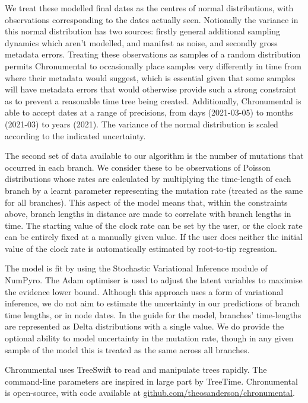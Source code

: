 We treat these modelled final dates as the centres of normal distributions, with observations corresponding to the dates actually seen. Notionally the variance in this normal distribution has two sources: firstly general additional sampling dynamics which aren't modelled, and manifest as noise, and secondly gross metadata errors. Treating these observations as samples of a random distribution permits Chronumental to occasionally place samples very differently in time from where their metadata would suggest, which is essential given that some samples will have metadata errors that would otherwise provide such a strong constraint as to prevent a reasonable time tree being created. Additionally, Chronumental is able to accept dates at a range of precisions, from days (2021-03-05) to months (2021-03) to years (2021). The variance of the normal distribution is scaled according to the indicated uncertainty.

The second set of data available to our algorithm is the number of mutations that occurred in each branch. We consider these to be observations of Poisson distributions whose rates are calculated by multiplying the time-length of each branch by a learnt parameter representing the mutation rate (treated as the same for all branches). This aspect of the model means that, within the constraints above, branch lengths in distance are made to correlate with branch lengths in time. The starting value of the clock rate can be set by the user, or the clock rate can be entirely fixed at a manually given value. If the user does neither the initial value of the clock rate is automatically estimated by root-to-tip regression.

The model is fit by using the Stochastic Variational Inference module of NumPyro. The Adam optimiser is used to adjust the latent variables to maximise the evidence lower bound. Although this approach uses a form of variational inference, we do not aim to estimate the uncertainty in our predictions of branch time lengths, or in node dates. In the guide for the model, branches' time-lengths are represented as Delta distributions with a single value. We do provide the optional ability to model uncertainty in the mutation rate, though in any given sample of the model this is treated as the same across all branches.

Chronumental uses TreeSwift \citep{treeswift} to read and manipulate trees rapidly. The command-line parameters are inspired in large part by TreeTime. Chronumental is open-source, with code available at \url{github.com/theosanderson/chronumental}.

